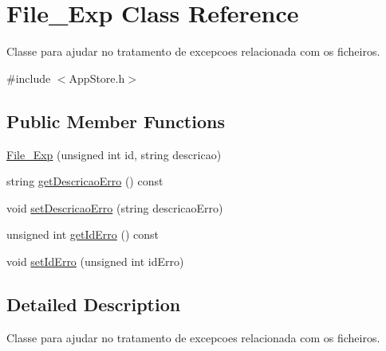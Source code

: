 \hypertarget{class_file___exp}{\section{File\+\_\+\+Exp Class Reference}
\label{class_file___exp}
}


Classe para ajudar no tratamento de excepcoes relacionada com os ficheiros.  




{\ttfamily \#include $<$App\+Store.\+h$>$}

\subsection*{Public Member Functions}
\begin{DoxyCompactItemize}
\item 
\hyperlink{class_file___exp_a58f6ca21d2f005ac65bfd05dce33d5c3}{File\+\_\+\+Exp} (unsigned int id, string descricao)
\item 
string \hyperlink{class_file___exp_a8c54a476c0b327bc50071d53bb1326e8}{get\+Descricao\+Erro} () const 
\item 
void \hyperlink{class_file___exp_a0b9435b9ae23d16e1e9041d493f4cd12}{set\+Descricao\+Erro} (string descricao\+Erro)
\item 
unsigned int \hyperlink{class_file___exp_a12f0d708ab52cf35bba854edc1c8b4ce}{get\+Id\+Erro} () const 
\item 
void \hyperlink{class_file___exp_a05c75e2239f556dfed4818575cd010c7}{set\+Id\+Erro} (unsigned int id\+Erro)
\end{DoxyCompactItemize}


\subsection{Detailed Description}
Classe para ajudar no tratamento de excepcoes relacionada com os ficheiros. 

